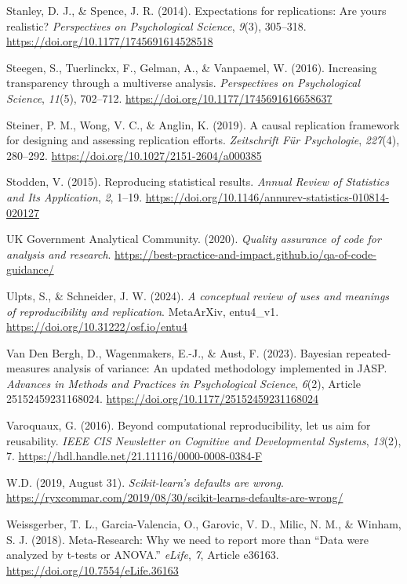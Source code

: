 \documentclass[authordate, meta]{jote-new-article}
\begin{document}
	Stanley, D. J., \& Spence, J. R. (2014). Expectations for replications: Are yours realistic? \emph{Perspectives on Psychological Science}, \emph{9}(3), 305--318. \url{https://doi.org/10.1177/1745691614528518}


	Steegen, S., Tuerlinckx, F., Gelman, A., \& Vanpaemel, W. (2016). Increasing transparency through a multiverse analysis. \emph{Perspectives on Psychological Science}, \emph{11}(5), 702--712. \url{https://doi.org/10.1177/1745691616658637}


	Steiner, P. M., Wong, V. C., \& Anglin, K. (2019). A causal replication framework for designing and assessing replication efforts. \emph{Zeitschrift Für Psychologie}, \emph{227}(4), 280--292. \url{https://doi.org/10.1027/2151-2604/a000385}


	Stodden, V. (2015). Reproducing statistical results. \emph{Annual Review of Statistics and Its Application}, \emph{2}, 1--19. \url{https://doi.org/10.1146/annurev-statistics-010814-020127}


	UK Government Analytical Community. (2020). \emph{Quality assurance of code for analysis and research}. \url{https://best-practice-and-impact.github.io/qa-of-code-guidance/}


	Ulpts, S., \& Schneider, J. W. (2024). \emph{A conceptual review of uses and meanings of reproducibility and replication}. MetaArXiv, entu4\_v1. \url{https://doi.org/10.31222/osf.io/entu4}


	Van Den Bergh, D., Wagenmakers, E.-J., \& Aust, F. (2023). Bayesian repeated-measures analysis of variance: An updated methodology implemented in JASP. \emph{Advances in Methods and Practices in Psychological Science}, \emph{6}(2), Article 25152459231168024. \url{https://doi.org/10.1177/25152459231168024}


	Varoquaux, G. (2016). Beyond computational reproducibility, let us aim for reusability. \emph{IEEE CIS Newsletter on Cognitive and Developmental Systems}, \emph{13}(2), 7. \url{https://hdl.handle.net/21.11116/0000-0008-0384-F}


	W.D. (2019, August 31). \emph{Scikit-learn's defaults are wrong}. \url{https://ryxcommar.com/2019/08/30/scikit-learns-defaults-are-wrong/}


	Weissgerber, T. L., Garcia-Valencia, O., Garovic, V. D., Milic, N. M., \& Winham, S. J. (2018). Meta-Research: Why we need to report more than “Data were analyzed by t-tests or ANOVA.” \emph{eLife}, \emph{7}, Article e36163. \url{https://doi.org/10.7554/eLife.36163}
\end{document}
